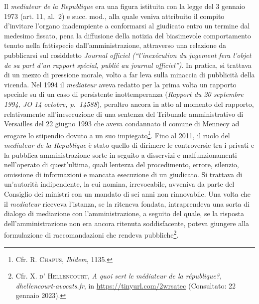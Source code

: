 \documentclass[12pt,it,a4paper,]{report}
\begin{document}
Il \emph{mediateur de la Republique} era una figura istituita con la
legge del 3 gennaio 1973 (art. 11, al.~2) e succ. mod., alla quale
veniva attribuito il compito d'invitare l'organo inadempiente a
conformarsi al giudicato entro un termine dal medesimo fissato, pena la
diffusione della notizia del biasimevole comportamento tenuto nella
fattispecie dall'amministrazione, attraverso una relazione da
pubblicarsi sul cosiddetto \emph{Journal officiel (``l'inexécution du
jugement fera l'objet de sa part d'un rapport spécial, publié au journal
officiel'')}. In pratica, si trattava di un mezzo di pressione morale,
volto a far leva sulla minaccia di pubblicità della vicenda. Nel 1994 il
\emph{mediateur} aveva redatto per la prima volta un rapporto speciale
su di un caso di persistente inottemperanza (\emph{Rapport du 20
septembre 1994, JO 14 octobre, p.~14588}), peraltro ancora in atto al
momento del rapporto, relativamente all'inesecuzione di una sentenza del
Tribunale amministrativo di Versailles del 22 giugno 1993 che aveva
condannato il comune di Mennecy ad erogare lo stipendio dovuto a un suo
impiegato\footnote{Cfr. R. \textsc{Chapus}, \emph{Ibidem}, 1135.}. Fino
al 2011, il ruolo del \emph{mediateur de la Republique} è stato quello
di dirimere le controversie tra i privati e la pubblica amministrazione
sorte in seguito a disservizi e malfunzionamenti nell'operato di
quest'ultima, quali lentezza del procedimento, errore, silenzio,
omissione di informazioni e mancata esecuzione di un giudicato. Si
trattava di un'autorità indipendente, la cui nomina, irrevocabile,
avveniva da parte del Consiglio dei ministri con un mandato di sei anni
non rinnovabile. Una volta che il \emph{mediateur} riceveva l'istanza,
se la riteneva fondata, intraprendeva una sorta di dialogo di mediazione
con l'amministrazione, a seguito del quale, se la risposta
dell'amministrazione non era ancora ritenuta soddisfacente, poteva
giungere alla formulazione di raccomandazioni che rendeva
pubbliche\footnote{Cfr. X. \textsc{d'} \textsc{Hellencourt}, \emph{A
  quoi sert le médiateur de la république?},
  \emph{dhellencourt-avocats.fr}, in \url{https://tinyurl.com/2wrsatec}
  (Consultato: 22 gennaio 2023).}.
\end{document}

